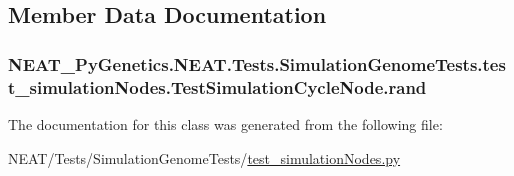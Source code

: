 \subsection{Member Data Documentation}
\subsubsection[{\texorpdfstring{rand}{rand}}]{\setlength{\rightskip}{0pt plus 5cm}N\+E\+A\+T\+\_\+\+Py\+Genetics.\+N\+E\+A\+T.\+Tests.\+Simulation\+Genome\+Tests.\+test\+\_\+simulation\+Nodes.\+Test\+Simulation\+Cycle\+Node.\+rand}\hypertarget{classNEAT__PyGenetics_1_1NEAT_1_1Tests_1_1SimulationGenomeTests_1_1test__simulationNodes_1_1TestSimulationCycleNode_a0ad6f4a80ac5521840deb8b91dde6020}{}\label{classNEAT__PyGenetics_1_1NEAT_1_1Tests_1_1SimulationGenomeTests_1_1test__simulationNodes_1_1TestSimulationCycleNode_a0ad6f4a80ac5521840deb8b91dde6020}


The documentation for this class was generated from the following file\+:\begin{DoxyCompactItemize}
\item 
N\+E\+A\+T/\+Tests/\+Simulation\+Genome\+Tests/\hyperlink{test__simulationNodes_8py}{test\+\_\+simulation\+Nodes.\+py}\end{DoxyCompactItemize}
